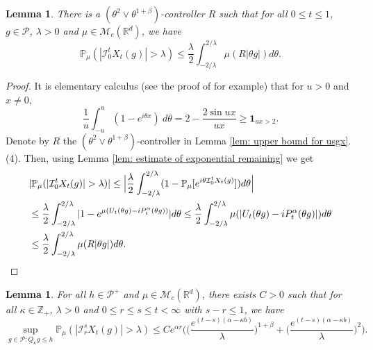 \documentclass[12pt,a4paper]{amsart}
\theoremstyle{plain}
\newtheorem{lem}[thm]{Lemma}
\theoremstyle{definition}
\numberwithin{equation}{section}
\begin{document}
\begin{lem}
  \label{lem: control pair for P(M>lambda)}
  There is a $(\theta^2\vee\theta^{1+\beta})$-controller $R$ such that for all $0\leq t\leq 1$, $g\in \mathcal P$, $\lambda >0$ and $\mu\in \mathcal M_c(\mathbb R^d)$, we have
  \[
    \mathbb P_\mu ( |\mathcal{I}_0^tX_t(g)| > \lambda)
    \leq \frac{\lambda}{2}\int_{-2/\lambda}^{2/\lambda}\mu(R|\theta g|) d\theta.
  \]
\end{lem}

\begin{proof}
  It is elementary calculus (see the proof of \cite[Theorem 3.3.6]{Durrett2010Probability} for example) that
for $u>0$ and $x\neq0$,
  \[\frac{1}{u}\int_{-u}^u (1- e^{i\theta x})~d\theta = 2 - \frac{2\sin ux}{ux} \geq \mathbf 1_{ux>2}.\]
  Denote by $R$ the $(\theta^2\vee\theta^{1+\beta})$-controller in Lemma \ref{lem: upper bound for usgx}.(4).
  Then, using Lemma \ref{lem: estimate of exponential remaining} we get
  \begin{align}
    & |\mathbb P_\mu (|\mathcal{I}_0^tX_t(g)| > \lambda)|
       \leq \Big|\frac{\lambda}{2}\int_{-2/\lambda}^{2/\lambda}(1 - \mathbb P_\mu[e^{i\theta \mathcal{I}_0^tX_t(g)}])d\theta\Big| \\
     & \leq \frac{\lambda}{2}\int_{-2/\lambda}^{2/\lambda}|1-e^{\mu(U_t(\theta g)-iP^\alpha_t (\theta g))}|d\theta
     \leq \frac{\lambda}{2}\int_{-2/\lambda}^{2/\lambda}\mu(|U_t(\theta g) - iP^\alpha_t(\theta g)|) d\theta \\
     & \leq \frac{\lambda}{2}\int_{-2/\lambda}^{2/\lambda}\mu(R|\theta g|) d\theta.
      \qedhere
  \end{align}
\end{proof}

\begin{lem}
  \label{lem: temp}
  For all $h \in \mathcal P^+$ and $\mu \in \mathcal M_c(\mathbb R^d)$, there exists $C > 0$ such that for all $\kappa \in \mathbb Z_+ $, $\lambda > 0$ and $0\leq r\leq s\leq t<\infty$ with $s-r \leq 1$, we have
  \[
     \sup_{g \in \mathcal P: Q_\kappa g\leq h}\mathbb P_{\mu}(|\mathcal I_r^sX_t(g)|>\lambda)
    \leq C e^{\alpha r} \Big(\Big( \frac{e^{(t-s)(\alpha - \kappa b)}}{\lambda}\Big)^{1+\beta} + \Big( \frac{e^{(t-s)(\alpha - \kappa b)}}{\lambda}\Big)^{2} \Big).
  \]
\end{lem}
\end{document}
